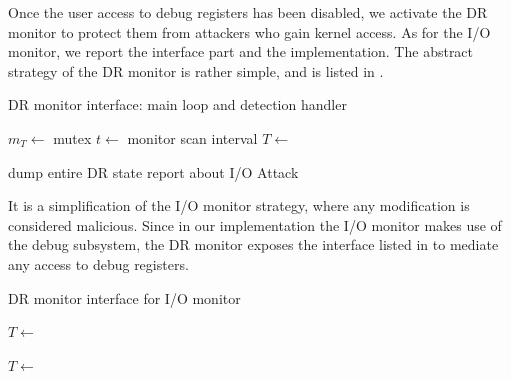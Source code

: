 Once the user access to debug registers has been disabled, we activate the DR monitor to protect them from attackers who gain kernel access.
As for the I/O monitor, we report the interface part and the implementation.
The abstract strategy of the DR monitor is rather simple, and is listed in .
\begin{algorithm}[h]
\caption{DR monitor interface: main loop and detection handler}
\label{alg:dr-iface}
\begin{algorithmic}[1]
	\State $m_T \gets$ mutex 
	\State $t \gets$ monitor scan interval 
	\State $T \gets$  
	\Loop
		\State {}
		\State {} 
		\State {}
			\State \Return {}
		\EndIf
		\State {} 
	\EndLoop
\EndFunction
\Statex
\end{algorithmic}

\begin{algorithmic}[1]
 
		\State dump entire DR state
	\EndIf
	\State report about I/O Attack
		\State {} 
	\EndIf
\EndFunction
\end{algorithmic}
\end{algorithm}
It is a simplification of the I/O monitor strategy, where any modification is considered malicious.
Since in our implementation the I/O monitor makes use of the debug subsystem, the DR monitor exposes the interface listed in 
to mediate any access to debug registers.
\begin{algorithm}[h]
\caption{DR monitor interface for I/O monitor}
\label{alg:dr-ioiface}
\begin{algorithmic}[1]
 
	\State {}
	\State {} 
	\State $T \gets$  
	\State {}
\EndFunction
\Statex
\end{algorithmic}

\begin{algorithmic}[1]
 
	\State {}
	\State {} 
	\State $T \gets$  
	\State {}
\EndFunction
\end{algorithmic}
\end{algorithm}
